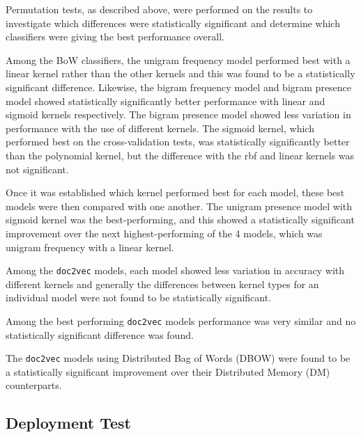 \documentclass[twocolumn]{article}
\begin{document}
Permutation tests, as described above, were performed on the results to investigate which differences were statistically significant and determine which classifiers were giving the best performance overall.

Among the BoW classifiers, the unigram frequency model performed best with a linear kernel rather than the other kernels and this was found to be a statistically significant difference. Likewise, the bigram frequency model and bigram presence model showed statistically significantly better performance with linear and sigmoid kernels respectively. The bigram presence model showed less variation in performance with the use of different kernels. The sigmoid kernel, which performed best on the cross-validation tests, was statistically significantly better than the polynomial kernel, but the difference with the rbf and linear kernels was not significant.

Once it was established which kernel performed best for each model, these best models were then compared with one another. The unigram presence model with sigmoid kernel was the best-performing, and this showed a statistically significant improvement over the next highest-performing of the 4 models, which was unigram frequency with a linear kernel.

Among the \texttt{doc2vec} models, each model showed less variation in accuracy with different kernels and generally the differences between kernel types for an individual model were not found to be statistically significant.

Among the best performing \texttt{doc2vec} models performance was very similar and no statistically significant difference was found.

The \texttt{doc2vec} models using Distributed Bag of Words (DBOW) were found to be a statistically significant improvement over their Distributed Memory (DM) counterparts.

\subsection{Deployment Test}
\end{document}
